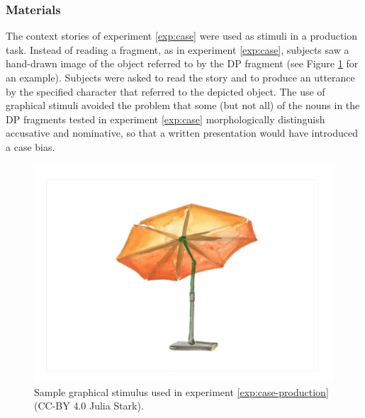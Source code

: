 \subsubsection{Materials}
The context stories of experiment \ref{exp:case} were used as stimuli in a production task. Instead of reading a fragment, as in experiment \ref{exp:case}, subjects saw a hand-drawn image of the object referred to by the DP fragment (see Figure \ref{fig:production-stim} for an example). Subjects were asked to read the story and to produce an utterance by the specified character that referred to the depicted object. The use of graphical stimuli avoided the problem that some (but not all) of the nouns in the DP fragments tested in experiment \ref{exp:case} morphologically distinguish accusative and nominative, so that a written presentation would have introduced a case bias.

\begin{figure}
 \includegraphics[scale=.3]{figures/production_sunshade.pdf}
 \caption{Sample graphical stimulus used in experiment \ref{exp:case-production} (CC-BY 4.0 Julia Stark).\label{fig:production-stim}}
\end{figure}

